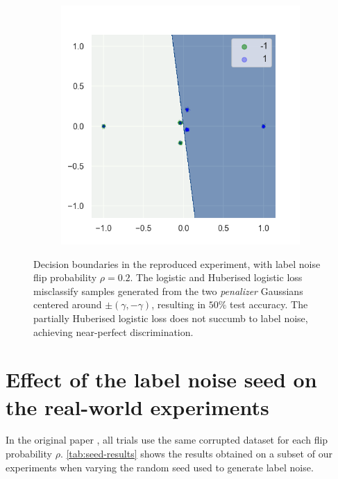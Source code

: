 \begin{figure}[htp]
\begin{subfigure}{0.31\linewidth}
    \label{fig:huber}
  \end{subfigure}
  \hfill
  \begin{subfigure}{0.31\linewidth}
        \includegraphics[width=\columnwidth]{figs/boundaries_Partial Huberised.png}
    \label{fig:phuber}
  \end{subfigure}
  \caption{Decision boundaries in the reproduced \citet{long_random_2010} experiment, with label noise flip probability $\rho = 0.2$. The logistic and Huberised logistic loss misclassify samples generated from the two \emph{penalizer} Gaussians centered around $\pm(\gamma, -\gamma)$, resulting in $50\%$ test accuracy. The partially Huberised logistic loss does not succumb to label noise, achieving near-perfect discrimination.}
  \label{fig:syntheticboundaries}
\end{figure}

\section{Effect of the label noise seed on the real-world experiments}
In the original paper \citep{menon_can_2019}, all trials use the same corrupted dataset for each flip probability $\rho$. \autoref{tab:seed-results} shows the results obtained on a subset of our experiments when varying the random seed used to generate label noise.

